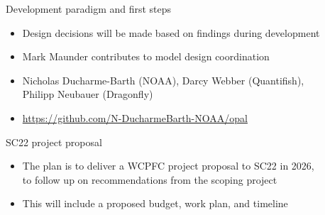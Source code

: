 \documentclass[aspectratio=169]{beamer}
\begin{document}

\begin{frame}{Development paradigm and first steps}\small
  \begin{itemize}
    \item[-] Design decisions will be made based on findings during
    development\\[1.6ex]
    \item[-] Mark Maunder contributes to model design coordination
  \end{itemize}
  \vspace{5ex}
  \begin{itemize}
    \item[-] Nicholas Ducharme-Barth (NOAA), Darcy Webber (Quantifish),\\[0.5ex]
    Philipp Neubauer (Dragonfly)\\[1.2ex]
    \item[] \blue\fns
    \url{https://github.com/N-DucharmeBarth-NOAA/opal}\\[1.2ex]
  \end{itemize}
\end{frame}


\begin{frame}{SC22 project proposal}\small
  \\[2ex]
  \begin{itemize}
    \item[] The plan is to deliver a WCPFC project proposal to SC22 in
    2026,\\[0.4ex]
    to follow up on recommendations from the scoping project\\[4ex]
    \item[] This will include a proposed {\darkgreen budget}, {\darkgreen work
      plan}, and {\darkgreen timeline}
  \end{itemize}
\end{frame}

\end{document}
